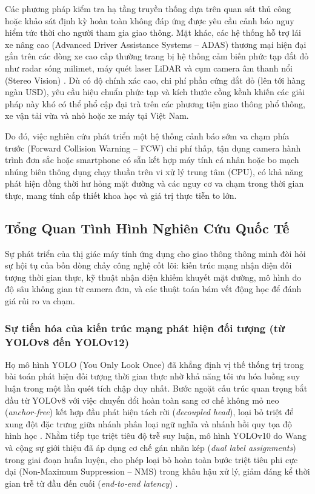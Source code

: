 \documentclass[12pt,a4paper]{article}
\begin{document}
Các phương pháp kiểm tra hạ tầng truyền thống dựa trên quan sát thủ công hoặc khảo sát định kỳ hoàn toàn không đáp ứng được yêu cầu cảnh báo nguy hiểm tức thời cho người tham gia giao thông. Mặt khác, các hệ thống hỗ trợ lái xe nâng cao (Advanced Driver Assistance Systems -- ADAS) thương mại hiện đại gắn trên các dòng xe cao cấp thường trang bị hệ thống cảm biến phức tạp đắt đỏ như radar sóng milimet, máy quét laser LiDAR và cụm camera âm thanh nổi (Stereo Vision) \cite{27}. Dù có độ chính xác cao, chi phí phần cứng đắt đỏ (lên tới hàng ngàn USD), yêu cầu hiệu chuẩn phức tạp và kích thước cồng kềnh khiến các giải pháp này khó có thể phổ cập đại trà trên các phương tiện giao thông phổ thông, xe vận tải vừa và nhỏ hoặc xe máy tại Việt Nam.

Do đó, việc nghiên cứu phát triển một hệ thống cảnh báo sớm va chạm phía trước (Forward Collision Warning -- FCW) chi phí thấp, tận dụng camera hành trình đơn sắc hoặc smartphone có sẵn kết hợp máy tính cá nhân hoặc bo mạch nhúng biên thông dụng chạy thuần trên vi xử lý trung tâm (CPU), có khả năng phát hiện đồng thời hư hỏng mặt đường và các nguy cơ va chạm trong thời gian thực, mang tính cấp thiết khoa học và giá trị thực tiễn to lớn.

\subsection{Tổng Quan Tình Hình Nghiên Cứu Quốc Tế}
Sự phát triển của thị giác máy tính ứng dụng cho giao thông thông minh đòi hỏi sự hội tụ của bốn dòng chảy công nghệ cốt lõi: kiến trúc mạng nhận diện đối tượng thời gian thực, kỹ thuật nhận diện khiếm khuyết mặt đường, mô hình đo độ sâu không gian từ camera đơn, và các thuật toán bám vết động học để đánh giá rủi ro va chạm.

\subsubsection{Sự tiến hóa của kiến trúc mạng phát hiện đối tượng (từ YOLOv8 đến YOLOv12)}
Họ mô hình YOLO (You Only Look Once) đã khẳng định vị thế thống trị trong bài toán phát hiện đối tượng thời gian thực nhờ khả năng tối ưu hóa luồng suy luận trong một lần quét tích chập duy nhất. Bước ngoặt cấu trúc quan trọng bắt đầu từ YOLOv8 với việc chuyển đổi hoàn toàn sang cơ chế không mỏ neo (\textit{anchor-free}) kết hợp đầu phát hiện tách rời (\textit{decoupled head}), loại bỏ triệt để xung đột đặc trưng giữa nhánh phân loại ngữ nghĩa và nhánh hồi quy tọa độ hình học \cite{1, 3}. Nhằm tiếp tục triệt tiêu độ trễ suy luận, mô hình YOLOv10 do Wang và cộng sự giới thiệu đã áp dụng cơ chế gán nhãn kép (\textit{dual label assignments}) trong giai đoạn huấn luyện, cho phép loại bỏ hoàn toàn bước triệt tiêu phi cực đại (Non-Maximum Suppression -- NMS) trong khâu hậu xử lý, giảm đáng kể thời gian trễ từ đầu đến cuối (\textit{end-to-end latency}) \cite{5}.
\end{document}
